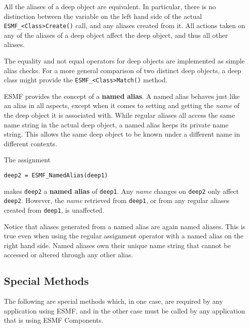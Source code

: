 All the aliases of a deep object are equivalent. In particular, there is no
distinction between the variable on the left hand side of the actual
{\tt ESMF\_<Class>Create()} call, and any aliases created from it. All actions
taken on any of the aliases of a deep object affect the deep object, and thus
all other aliases.

The equality and not equal operators for deep objects are implemented as simple
alias checks. For a more general comparison of two distinct deep objects, a
deep class might provide the {\tt ESMF\_<Class>Match()} method.

ESMF provides the concept of a {\bf named alias}. A named alias behaves just
like an alias in all aspects, except when it comes to setting and getting the
{\em name} of the deep object it is associated with. While regular aliases
all access the same name string in the actual deep object, a named alias keeps
its private name string. This allows the same deep object to be known under a
different name in different contexts.

The assignment
\begin{verbatim}
deep2 = ESMF_NamedAlias(deep1)
\end{verbatim}
makes {\tt deep2} a {\bf named alias} of {\tt deep1}. Any {\em name} changes on
{\tt deep2} only affect {\tt deep2}. However, the {\em name} retrieved from
{\tt deep1}, or from any regular aliases created from {\tt deep1}, is
unaffected.

Notice that aliases generated from a named alias are again named aliases. This
is true even when using the regular assignment operator with a named alias on
the right hand side. Named aliases own their unique name string that cannot
be accessed or altered through any other alias.



\subsection{Special Methods}

The following are special methods which, in one case,
are required by any application using ESMF, and in the 
other case must be called by any application that is using 
ESMF Components.

